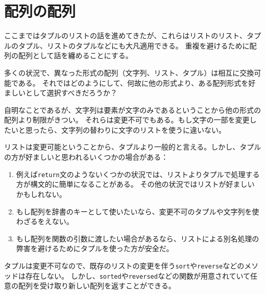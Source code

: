 \documentclass[a4j,12pt,makeidx]{jbook}
\begin{document}
\section{配列の配列}
ここまではタプルのリストの話を進めてきたが、これらはリストのリスト、タプルのタプル、リストのタプルなどにも大凡適用できる。
重複を避けるために配列の配列として話を纏めることにする。\par
多くの状況で、異なった形式の配列（文字列、リスト、タプル）は相互に交換可能である。
それではどのようにして、何故に他の形式より、ある配列形式を好ましいとして選択すべきだろうか？\par
自明なことであるが、文字列は要素が文字のみであるということから他の形式の配列より制限がきつい。
それらは変更不可でもある。もし文字の一部を変更したいと思ったら、文字列の替わりに文字のリストを使うに違いない。\par
リストは変更可能ということから、タプルより一般的と言える。しかし、タプルの方が好ましいと思われるいくつかの場合がある：
\begin{enumerate}
\item 例えば{\tt return}文のようないくつかの状況では、リストよりタプルで処理する方が構文的に簡単になることがある。
その他の状況ではリストが好ましいかもしれない。
\item もし配列を辞書のキーとして使いたいなら、変更不可のタプルや文字列を使わざるをえない。
\item もし配列を関数の引数に渡したい場合があるなら、リストによる別名処理の弊害を避けるためにタプルを使った方が安全だ。
\end{enumerate}
タプルは変更不可なので、既存のリストの変更を伴う{\tt sort}や{\tt reverse}などのメソッドは存在しない。
しかし、{\tt sorted}や{\tt reversed}などの関数が用意されていて任意の配列を受け取り新しい配列を返すことができる。
%
\end{document}
